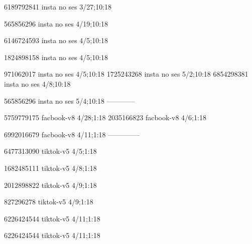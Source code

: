 6189792841 insta no ses
3/27;10:18

565856296 insta no ses
4/19;10:18

6146724593 insta no ses
4/5;10:18

1824898158 insta no ses
4/5;10:18

971062017 insta no ses
4/5;10:18
1725243268 insta no ses
5/2;10:18
6854298381 insta no ses
4/8;10:18

565856296 insta no ses
5/4;10:18
------------


5759779175 facbook-v8
4/28;1:18
2035166823 facbook-v8
4/6;1:18

6992016679 facbook-v8
4/11;1:18
--------------



6477313090 tiktok-v5
4/5;1:18

1682485111 tiktok-v5
4/8;1:18

2012898822 tiktok-v5
4/9;1:18

827296278 tiktok-v5
4/9;1:18

6226424544 tiktok-v5
4/11;1:18


6226424544 tiktok-v5
4/11;1:18


